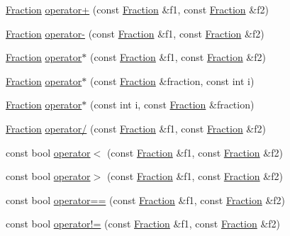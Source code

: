 \begin{DoxyCompactItemize}
\hyperlink{classprism_1_1_fraction}{Fraction} \hyperlink{namespaceprism_ac1b5b2765c314b2baa2dba5c57419829}{operator+} (const \hyperlink{classprism_1_1_fraction}{Fraction} \&f1, const \hyperlink{classprism_1_1_fraction}{Fraction} \&f2)
\item 
\hyperlink{classprism_1_1_fraction}{Fraction} \hyperlink{namespaceprism_a2daf470e5f35f8450447deb2634c22c1}{operator-\/} (const \hyperlink{classprism_1_1_fraction}{Fraction} \&f1, const \hyperlink{classprism_1_1_fraction}{Fraction} \&f2)
\item 
\hyperlink{classprism_1_1_fraction}{Fraction} \hyperlink{namespaceprism_ac4f48e3429a86bafcc7c21a2bd6a7ae1}{operator$\ast$} (const \hyperlink{classprism_1_1_fraction}{Fraction} \&f1, const \hyperlink{classprism_1_1_fraction}{Fraction} \&f2)
\item 
\hyperlink{classprism_1_1_fraction}{Fraction} \hyperlink{namespaceprism_a1f5007702b28b447f62c3b9df62f2aa4}{operator$\ast$} (const \hyperlink{classprism_1_1_fraction}{Fraction} \&fraction, const int i)
\item 
\hyperlink{classprism_1_1_fraction}{Fraction} \hyperlink{namespaceprism_af1ff5871f65565a84b886c5013bcd50a}{operator$\ast$} (const int i, const \hyperlink{classprism_1_1_fraction}{Fraction} \&fraction)
\item 
\hyperlink{classprism_1_1_fraction}{Fraction} \hyperlink{namespaceprism_a7ba7b5cc9750f0d6cda50f0cb874da6f}{operator/} (const \hyperlink{classprism_1_1_fraction}{Fraction} \&f1, const \hyperlink{classprism_1_1_fraction}{Fraction} \&f2)
\item 
const bool \hyperlink{namespaceprism_a105ac9995ade66ebb2a039ef90751c7a}{operator$<$} (const \hyperlink{classprism_1_1_fraction}{Fraction} \&f1, const \hyperlink{classprism_1_1_fraction}{Fraction} \&f2)
\item 
const bool \hyperlink{namespaceprism_a7122a7ff43fc6aba9cef9d31fe8c7559}{operator$>$} (const \hyperlink{classprism_1_1_fraction}{Fraction} \&f1, const \hyperlink{classprism_1_1_fraction}{Fraction} \&f2)
\item 
const bool \hyperlink{namespaceprism_a5b9e84008b9eaa99d29d4b74cd150cd8}{operator==} (const \hyperlink{classprism_1_1_fraction}{Fraction} \&f1, const \hyperlink{classprism_1_1_fraction}{Fraction} \&f2)
\item 
const bool \hyperlink{namespaceprism_aea72179b12983e614f72acd2b3cbf0e0}{operator!=} (const \hyperlink{classprism_1_1_fraction}{Fraction} \&f1, const \hyperlink{classprism_1_1_fraction}{Fraction} \&f2)
\item 

\end{DoxyCompactItemize}
